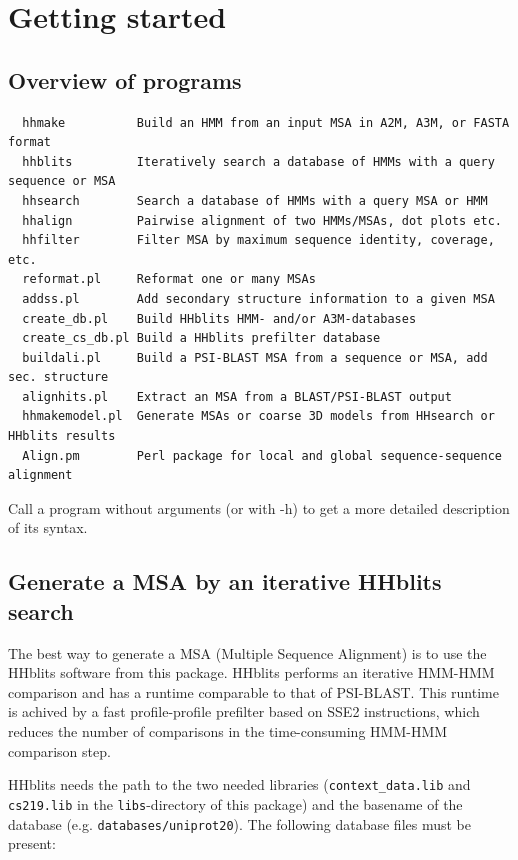 \documentclass[11pt,a4paper]{article}
\begin{document}
\section{Getting started}

\subsection{Overview of programs}

\small 
\begin{verbatim}
  hhmake          Build an HMM from an input MSA in A2M, A3M, or FASTA format 
  hhblits         Iteratively search a database of HMMs with a query sequence or MSA
  hhsearch        Search a database of HMMs with a query MSA or HMM
  hhalign         Pairwise alignment of two HMMs/MSAs, dot plots etc.
  hhfilter        Filter MSA by maximum sequence identity, coverage, etc.  
  reformat.pl     Reformat one or many MSAs
  addss.pl        Add secondary structure information to a given MSA
  create_db.pl    Build HHblits HMM- and/or A3M-databases
  create_cs_db.pl Build a HHblits prefilter database
  buildali.pl     Build a PSI-BLAST MSA from a sequence or MSA, add sec. structure
  alignhits.pl    Extract an MSA from a BLAST/PSI-BLAST output
  hhmakemodel.pl  Generate MSAs or coarse 3D models from HHsearch or HHblits results	
  Align.pm        Perl package for local and global sequence-sequence alignment
\end{verbatim} 
\normalsize

Call a program without arguments (or with -h) to get a more detailed description of 
its syntax.


\subsection{Generate a MSA by an iterative HHblits search}\label{sect:start:msa_hhblits}

The best way to generate a MSA (Multiple Sequence Alignment) is to use the HHblits software 
from this package. HHblits performs an iterative HMM-HMM comparison and has a runtime comparable 
to that of PSI-BLAST. This runtime is achived by a fast profile-profile prefilter based on SSE2 
instructions, which reduces the number of comparisons in the time-consuming HMM-HMM comparison 
step.

HHblits needs the path to the two needed libraries
(\verb`context_data.lib` and \verb`cs219.lib` in the \verb`libs`-directory of this package) 
and the basename of the database (e.g. \verb`databases/uniprot20`). The following database files 
must be present:
\end{document}
